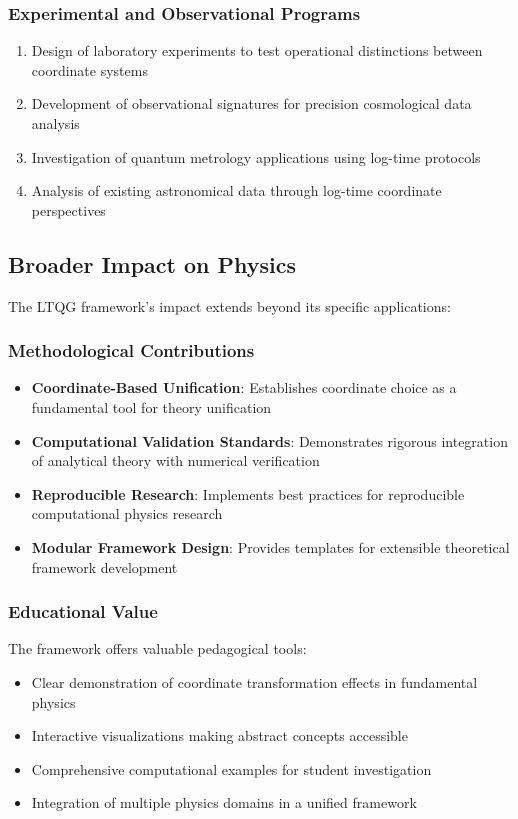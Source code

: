 \subsubsection{Experimental and Observational Programs}

\begin{enumerate}
\item Design of laboratory experiments to test operational distinctions between coordinate systems
\item Development of observational signatures for precision cosmological data analysis
\item Investigation of quantum metrology applications using log-time protocols
\item Analysis of existing astronomical data through log-time coordinate perspectives
\end{enumerate}

\subsection{Broader Impact on Physics}
\label{subsec:conclusion_broader_impact}

The LTQG framework's impact extends beyond its specific applications:

\subsubsection{Methodological Contributions}

\begin{itemize}
\item \textbf{Coordinate-Based Unification}: Establishes coordinate choice as a fundamental tool for theory unification
\item \textbf{Computational Validation Standards}: Demonstrates rigorous integration of analytical theory with numerical verification
\item \textbf{Reproducible Research}: Implements best practices for reproducible computational physics research
\item \textbf{Modular Framework Design}: Provides templates for extensible theoretical framework development
\end{itemize}

\subsubsection{Educational Value}

The framework offers valuable pedagogical tools:
\begin{itemize}
\item Clear demonstration of coordinate transformation effects in fundamental physics
\item Interactive visualizations making abstract concepts accessible
\item Comprehensive computational examples for student investigation
\item Integration of multiple physics domains in a unified framework
\end{itemize}

